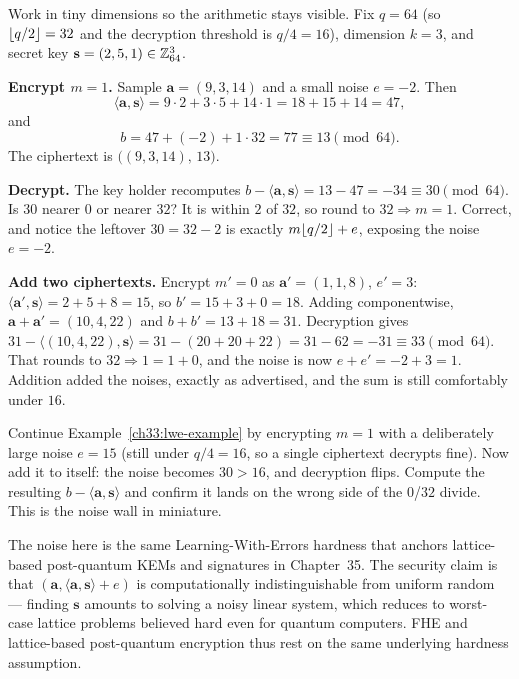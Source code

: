 \begin{example}
\label{ch33:lwe-example}
Work in tiny dimensions so the arithmetic stays visible. Fix $q = 64$ (so $\lfloor q/2\rfloor=32$ and the decryption threshold is $q/4 = 16$), dimension $k = 3$, and secret key $\mathbf{s} = (2, 5, 1)\in\mathbb{Z}_{64}^3$.

\textbf{Encrypt $m=1$.} Sample $\mathbf{a} = (9, 3, 14)$ and a small noise $e = -2$. Then
\[
  \langle\mathbf{a},\mathbf{s}\rangle = 9\cdot 2 + 3\cdot 5 + 14\cdot 1 = 18 + 15 + 14 = 47,
\]
and
\[
  b = 47 + (-2) + 1\cdot 32 = 77 \equiv 13 \pmod{64}.
\]
The ciphertext is $\bigl((9,3,14),\,13\bigr)$.

\textbf{Decrypt.} The key holder recomputes $b - \langle\mathbf{a},\mathbf{s}\rangle = 13 - 47 = -34 \equiv 30 \pmod{64}$. Is $30$ nearer $0$ or nearer $32$? It is within $2$ of $32$, so round to $32 \Rightarrow m = 1$. Correct, and notice the leftover $30 = 32 - 2$ is exactly $m\lfloor q/2\rfloor+e$, exposing the noise $e=-2$.

\textbf{Add two ciphertexts.} Encrypt $m'=0$ as $\mathbf{a}' = (1, 1, 8)$, $e' = 3$: $\langle\mathbf{a}',\mathbf{s}\rangle = 2 + 5 + 8 = 15$, so $b' = 15 + 3 + 0 = 18$. Adding componentwise, $\mathbf{a}+\mathbf{a}' = (10,4,22)$ and $b+b' = 13+18 = 31$. Decryption gives $31 - \langle(10,4,22),\mathbf{s}\rangle = 31 - (20+20+22) = 31 - 62 = -31 \equiv 33 \pmod{64}$. That rounds to $32 \Rightarrow 1 = 1 + 0$, and the noise is now $e+e' = -2+3 = 1$. Addition added the noises, exactly as advertised, and the sum is still comfortably under $16$.
\end{example}

\begin{labbox}
Continue Example~\ref{ch33:lwe-example} by encrypting $m=1$ with a deliberately large noise $e = 15$ (still under $q/4=16$, so a single ciphertext decrypts fine). Now add it to itself: the noise becomes $30 > 16$, and decryption flips. Compute the resulting $b - \langle\mathbf{a},\mathbf{s}\rangle$ and confirm it lands on the wrong side of the $0$/$32$ divide. This is the noise wall in miniature.
\end{labbox}

\begin{connectionbox}
The noise here is the same Learning-With-Errors hardness that anchors lattice-based post-quantum KEMs and signatures in Chapter~35. The security claim is that $(\mathbf{a}, \langle\mathbf{a},\mathbf{s}\rangle + e)$ is computationally indistinguishable from uniform random --- finding $\mathbf{s}$ amounts to solving a noisy linear system, which reduces to worst-case lattice problems believed hard even for quantum computers. FHE and lattice-based post-quantum encryption thus rest on the same underlying hardness assumption.
\end{connectionbox}

